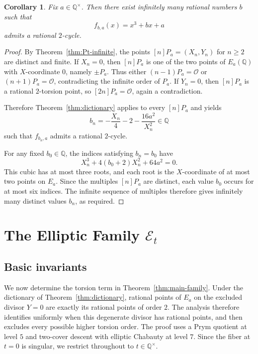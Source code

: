 \documentclass[11pt,a4paper]{amsart}
\newtheorem{corollary}[theorem]{Corollary}
\theoremstyle{definition}
\theoremstyle{remark}
\numberwithin{equation}{section}
\newcommand{\Q}{\mathbb{Q}}
\newcommand{\mathcalE}{\mathcal{E}}
\begin{document}
\begin{corollary}\label{cor:infinitely-many-b}
Fix $a\in\Q^\times$. Then there exist infinitely many rational numbers $b$ such that
\[
f_{b,a}(x)=x^3+bx+a
\]
admits a rational $2$-cycle.
\end{corollary}

\begin{proof}
By Theorem~\ref{thm:Pt-infinite}, the points
$[n]P_a=(X_n,Y_n)$ for $n\ge2$ are distinct and finite.
If $X_n=0$, then $[n]P_a$ is one of the two points of $E_a(\Q)$ with $X$-coordinate $0$, namely $\pm P_a$. Thus either $(n-1)P_a=\mathcal O$ or $(n+1)P_a=\mathcal O$, contradicting the infinite order of $P_a$. If $Y_n=0$, then $[n]P_a$ is a rational $2$-torsion point, so $[2n]P_a=\mathcal O$, again a contradiction.

Therefore Theorem~\ref{thm:dictionary} applies to every $[n]P_a$ and yields
\[
b_n=-\frac{X_n}{4}-2-\frac{16a^2}{X_n^2}\in\Q
\]
such that $f_{b_n,a}$ admits a rational $2$-cycle.

For any fixed $b_0\in\Q$, the indices satisfying $b_n=b_0$ have
\[
X_n^3+4(b_0+2)X_n^2+64a^2=0.
\]
This cubic has at most three roots, and each root is the $X$-coordinate
of at most two points on $E_a$. Since the multiples $[n]P_a$ are
distinct, each value $b_0$ occurs for at most six indices. The infinite
sequence of multiples therefore gives infinitely many distinct values
$b_n$, as required.
\end{proof}

\section{The Elliptic Family \texorpdfstring{$\mathcalE_t$}{Et}}\label{sec:elliptic-family}

\subsection{Basic invariants}\label{subsec:family-invariants}

We now determine the torsion term in Theorem~\ref{thm:main-family}.
Under the dictionary of Theorem~\ref{thm:dictionary}, rational points of
\(E_a\) on the excluded divisor \(Y=0\) are exactly its rational points of
order \(2\). The analysis therefore identifies uniformly when this
degenerate divisor has rational points, and then excludes every possible
higher torsion order. The proof uses a Prym quotient at level \(5\) and
two-cover descent with elliptic Chabauty at level \(7\). Since the fiber at
\(t=0\) is singular, we restrict throughout to \(t\in\Q^\times\).
\end{document}
